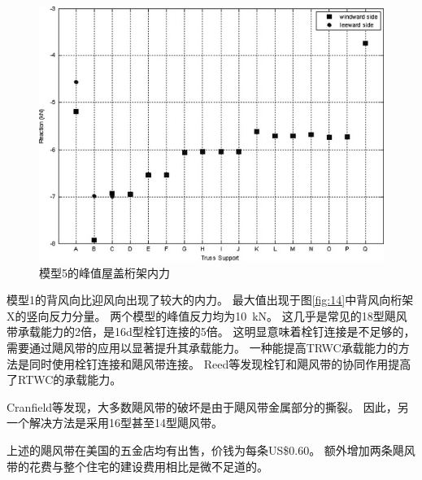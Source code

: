 \documentclass{ctexart}
\begin{document}
\begin{figure}
\centering
\includegraphics{./fig/16.jpg}
\caption{模型5的峰值屋盖桁架内力}
\label{fig:16}
\end{figure}



模型1的背风向比迎风向出现了较大的内力。
最大值出现于图\ref{fig:14}中背风向桁架X的竖向反力分量。
两个模型的峰值反力均为\SI{10}{kN}。
这几乎是常见的18型飓风带承载能力的2倍\cite{canfield1991uplift}，是16d型栓钉连接的5倍。
这明显意味着栓钉连接是不足够的，需要通过飓风带的应用以显著提升其承载能力。
一种能提高TRWC承载能力的方法是同时使用栓钉连接和飓风带连接。
Reed等\cite{reed1997uplift}发现栓钉和飓风带的协同作用提高了RTWC的承载能力。

Cranfield等\cite{canfield1991uplift}发现，大多数飓风带的破坏是由于飓风带金属部分的撕裂。
因此，另一个解决方法是采用16型甚至14型飓风带。

上述的飓风带在美国的五金店均有出售，价钱为每条US\$0.60。
额外增加两条飓风带的花费与整个住宅的建设费用相比是微不足道的。 	

\printbibliography
\end{document}
